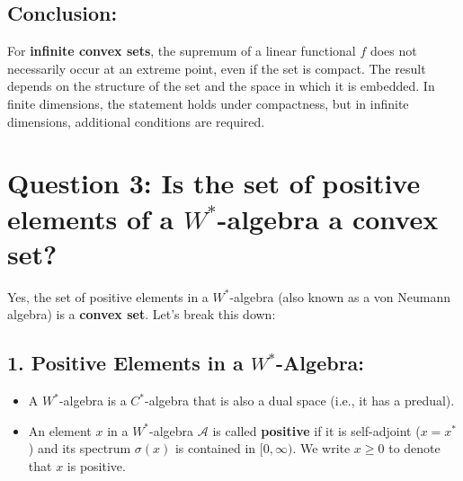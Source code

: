 \documentclass{article}
\begin{document}
\subsection*{Conclusion:}
For \textbf{infinite convex sets}, the supremum of a linear functional \( f \) does not necessarily occur at an extreme point, even if the set is compact. The result depends on the structure of the set and the space in which it is embedded. In finite dimensions, the statement holds under compactness, but in infinite dimensions, additional conditions are required.

\section*{Question 3: Is the set of positive elements of a \( W^* \)-algebra a convex set?}

Yes, the set of positive elements in a \( W^* \)-algebra (also known as a von Neumann algebra) is a \textbf{convex set}. Let's break this down:

\subsection*{1. Positive Elements in a \( W^* \)-Algebra:}
\begin{itemize}
    \item A \( W^* \)-algebra is a \( C^* \)-algebra that is also a dual space (i.e., it has a predual).
    \item An element \( x \) in a \( W^* \)-algebra \( \mathcal{A} \) is called \textbf{positive} if it is self-adjoint (\( x = x^* \)) and its spectrum \( \sigma(x) \) is contained in \( [0, \infty) \). We write \( x \geq 0 \) to denote that \( x \) is positive.
\end{itemize}
\end{document}
